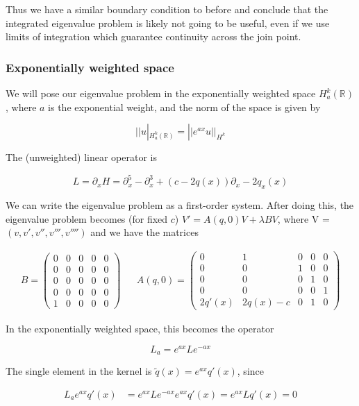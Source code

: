 \documentclass[12pt]{article}
\def\R{{\mathbb R}}
\begin{document}
Thus we have a similar boundary condition to before and conclude that the integrated eigenvalue problem is likely not going to be useful, even if we use limits of integration which guarantee continuity across the join point.

\subsubsection*{Exponentially weighted space}

We will pose our eigenvalue problem in the exponentially weighted space $H_a^k(\R)$, where $a$ is the exponential weight, and the norm of the space is given by

\[
||u|_{H_a^k(\R)} = ||e^{ax}u||_{H^k}
\]

The (unweighted) linear operator is

\[
L = \partial_x H = \partial_x^5 - \partial_x^3 + (c - 2q(x))\partial_x - 2 q_x(x)
\]

We can write the eigenvalue problem as a first-order system. After doing this, the eigenvalue problem becomes (for fixed $c$) $V' = A(q, 0)V + \lambda B V$, where V = $(v, v', v'', v''', v'''')$ and we have the matrices

\begin{align*}
B = \begin{pmatrix}0 & 0 & 0 & 0 & 0 \\0 & 0 & 0 & 0 & 0 \\0 & 0 & 0 & 0 & 0 \\0 & 0 & 0 & 0 & 0 \\1 & 0 & 0 & 0 & 0 \end{pmatrix} && 
A(q, 0) = \begin{pmatrix}0 & 1 & 0 & 0 & 0 \\0 & 0 & 1 & 0 & 0 \\0 & 0 & 0 & 1 & 0 \\0 & 0 & 0 & 0 & 1 \\
2q'(x) & 2q(x) - c & 0 & 1 & 0 \end{pmatrix} 
\end{align*}

In the exponentially weighted space, this becomes the operator

\[
L_a = e^{ax} L e^{-ax}
\]

The single element in the kernel is $\tilde{q}(x) = e^{ax} q'(x)$, since

\begin{align*}
L_a e^{ax} q'(x) &= e^{ax} L e^{-ax} e^{ax} q'(x) = e^{ax} L q'(x) = 0
\end{align*}
\end{document}

